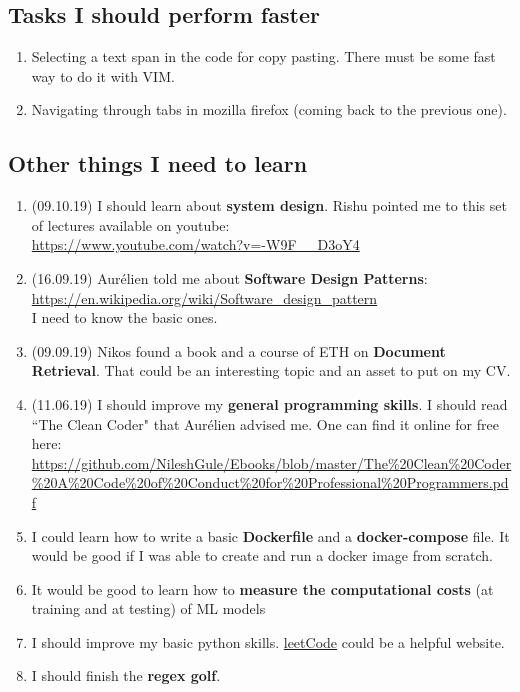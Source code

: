 \documentclass[11pt,a4paper]{article}
\begin{document}
\subsection{Tasks I should perform faster}
\begin{enumerate}
\item Selecting a text span in the code for copy pasting. There must be some fast way to do it with VIM.
\item Navigating through tabs in mozilla firefox (coming back to the previous one).
\end{enumerate}

\subsection{Other things I need to learn}
\begin{enumerate}
\item (09.10.19) I should learn about \textbf{system design}. Rishu pointed me to this set of lectures available on youtube:\\
\url{https://www.youtube.com/watch?v=-W9F__D3oY4}
\item (16.09.19) Aurélien told me about \textbf{Software Design Patterns}:\\
\url{https://en.wikipedia.org/wiki/Software_design_pattern}\\
I need to know the basic ones.
\item (09.09.19) Nikos found a book and a course of ETH on \textbf{Document Retrieval}. That could be an interesting topic and an asset to put on my CV.
\item (11.06.19) I should improve my \textbf{general programming skills}. I should read ``The Clean Coder" that Aurélien advised me. One can find it online for free here:\\
\url{https://github.com/NileshGule/Ebooks/blob/master/The%20Clean%20Coder%20A%20Code%20of%20Conduct%20for%20Professional%20Programmers.pdf}
\item I could learn how to write a basic \textbf{Dockerfile} and a \textbf{docker-compose} file. It would be good if I was able to create and run a docker image from scratch.
\item It would be good to learn how to \textbf{measure the computational costs} (at training and at testing) of ML models
\item I should improve my basic python skills. \href{https://leetcode.com/problemset/all/}{leetCode} could be a helpful website.
\item I should finish the \textbf{regex golf}.

\end{enumerate}
\end{document}
